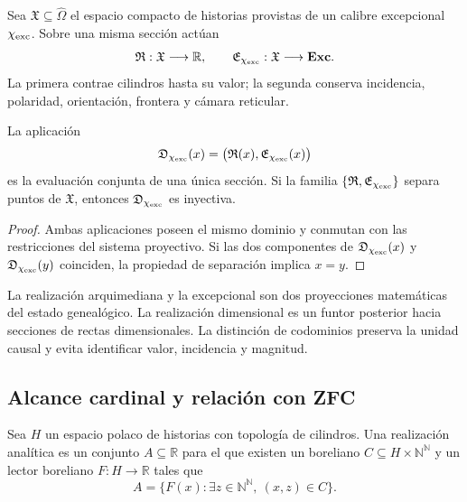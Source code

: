 Sea \(\mathfrak X\subseteq\widehat\Omega\) el espacio compacto de historias
provistas de un calibre excepcional \(\chi_{\rm exc}\). Sobre una misma
sección actúan
\begin{equation}
 \mathfrak R:\mathfrak X\longrightarrow\mathbb R,
 \qquad
 \mathfrak E_{\chi_{\rm exc}}:
 \mathfrak X\longrightarrow\mathbf{Exc}.
 \label{eq:dos-evaluaciones-mismo-dominio}
\end{equation}
La primera contrae cilindros hasta su valor; la segunda conserva incidencia,
polaridad, orientación, frontera y cámara reticular.

\begin{theorem}
\label{thm:doble-evaluacion}
La aplicación
\begin{equation}
 \mathfrak D_{\chi_{\rm exc}}(x)
 =\bigl(\mathfrak R(x),\mathfrak E_{\chi_{\rm exc}}(x)\bigr)
 \label{eq:aplicacion-doble-evaluacion}
\end{equation}
es la evaluación conjunta de una única sección. Si la familia
\(\{\mathfrak R,\mathfrak E_{\chi_{\rm exc}}\}\) separa puntos de
\(\mathfrak X\), entonces \(\mathfrak D_{\chi_{\rm exc}}\) es inyectiva.
\end{theorem}

\begin{proof}
Ambas aplicaciones poseen el mismo dominio y conmutan con las restricciones
del sistema proyectivo. Si las dos componentes de
\(\mathfrak D_{\chi_{\rm exc}}(x)\) y
\(\mathfrak D_{\chi_{\rm exc}}(y)\) coinciden, la propiedad de separación
implica \(x=y\).
\end{proof}

La realización arquimediana y la excepcional son dos proyecciones
matemáticas del estado genealógico. La realización dimensional es un funtor
posterior hacia secciones de rectas dimensionales. La distinción de
codominios preserva la unidad causal y evita identificar valor, incidencia y
magnitud.

\subsection{Alcance cardinal y relación con ZFC}

Sea \(H\) un espacio polaco de historias con topología de cilindros. Una
realización analítica es un conjunto \(A\subseteq\mathbb R\) para el que
existen un boreliano
\(C\subseteq H\times\mathbb N^{\mathbb N}\) y un lector boreliano
\(F:H\to\mathbb R\) tales que
\begin{equation}
 A=\{F(x):\exists z\in\mathbb N^{\mathbb N},\ (x,z)\in C\}.
 \label{eq:publicacion-analitica-hmt}
\end{equation}

